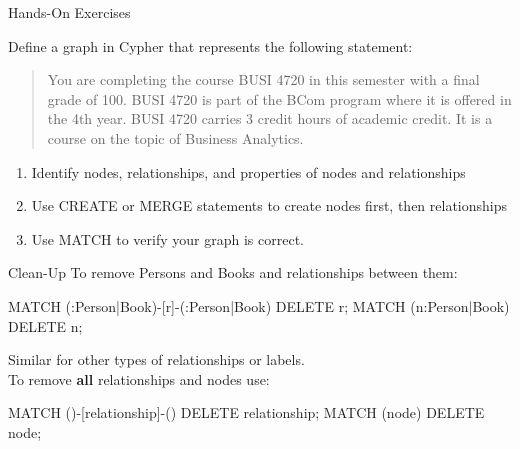 \documentclass[ignorenonframetext,xcolor=x11names]{beamer}
\begin{document}
\begin{frame}{Hands-On Exercises}

Define a graph in Cypher that represents the following statement:\\

\begin{quote}
You are completing the course BUSI 4720 in this semester with a final grade of 100. BUSI 4720 is part of the BCom program where it is offered in the 4th year. BUSI 4720 carries 3 credit hours of academic credit. It is a course on the topic of Business Analytics. 
\end{quote}

\begin{enumerate}
  \item Identify nodes, relationships, and properties of nodes and relationships
  \item Use CREATE or MERGE statements to create nodes first, then relationships
  \item Use MATCH to verify your graph is correct.
\end{enumerate}
\end{frame}

\begin{frame}[fragile]{Clean-Up}
To remove Persons and Books and relationships between them:
\footnotesize
\begin{cyphercode}
MATCH (:Person|Book)-[r]-(:Person|Book) DELETE r;
MATCH (n:Person|Book) DELETE n;
\end{cyphercode}
\normalsize
Similar for other types of relationships or labels. \\

To remove \textbf{all} relationships and nodes use:
\footnotesize
\begin{cyphercode}
MATCH ()-[relationship]-() DELETE relationship;
MATCH (node) DELETE node;
\end{cyphercode}
\normalsize
\end{frame}
\end{document}
